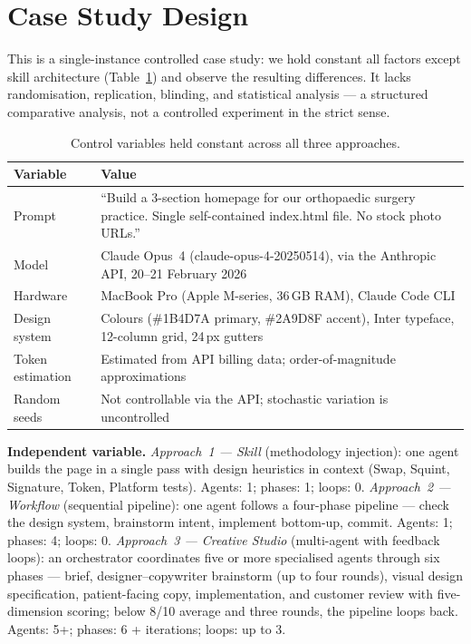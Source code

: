 \documentclass[a4paper]{llncs}
\begin{document}
\section{Case Study Design}
\label{sec:design}

This is a single-instance controlled case study: we hold constant all factors
except skill architecture (Table~\ref{tab:control}) and observe the resulting
differences. It lacks randomisation, replication, blinding, and statistical
analysis --- a structured comparative analysis, not a controlled experiment in
the strict sense.

\begin{table}[ht]
\caption{Control variables held constant across all three approaches.}
\label{tab:control}
\centering
\footnotesize
\begin{tabular}{>{\raggedright\arraybackslash}p{2.4cm}>{\raggedright\arraybackslash}p{8.5cm}}
\toprule
Variable & Value \\
\midrule
Prompt & ``Build a 3-section homepage for our orthopaedic surgery practice.
Single self-contained index.html file. No stock photo URLs.'' \\
Model & Claude Opus~4 (claude-opus-4-20250514), via the Anthropic API,
20--21 February 2026 \\
Hardware & MacBook Pro (Apple M-series, 36\,GB RAM), Claude Code CLI \\
Design system & Colours (\#1B4D7A primary, \#2A9D8F accent), Inter typeface,
12-column grid, 24\,px gutters \\
Token estimation & Estimated from API billing data; order-of-magnitude
approximations \\
Random seeds & Not controllable via the API; stochastic variation is
uncontrolled \\
\bottomrule
\end{tabular}
\end{table}

\textbf{Independent variable.} \emph{Approach~1 --- Skill} (methodology
injection): one agent builds the page in a single pass with design heuristics
in context (Swap, Squint, Signature, Token, Platform tests). Agents: 1;
phases: 1; loops: 0. \emph{Approach~2 --- Workflow} (sequential pipeline): one
agent follows a four-phase pipeline --- check the design system, brainstorm
intent, implement bottom-up, commit. Agents: 1; phases: 4; loops: 0.
\emph{Approach~3 --- Creative Studio} (multi-agent with feedback loops): an
orchestrator coordinates five or more specialised agents through six phases ---
brief, designer--copywriter brainstorm (up to four rounds), visual design
specification, patient-facing copy, implementation, and customer review with
five-dimension scoring; below 8/10 average and three rounds, the pipeline loops
back. Agents: 5+; phases: 6 + iterations; loops: up to 3.
\end{document}
